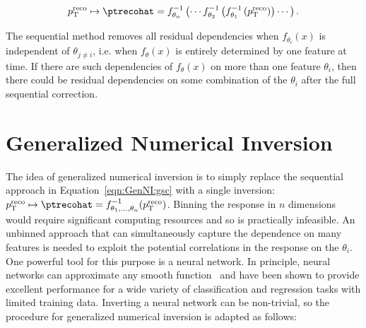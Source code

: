 \begin{align}
\label{eqn:GenNI:gsc}
p_\text{T}^\text{reco}\mapsto \ptrecohat = f_{\theta_{n}}^{-1}\left(\cdots f_{\theta_{2}}^{-1}\left(f_{\theta_{1}}^{-1}\left(p_\text{T}^\text{reco}\right)\right)\cdots\right).
\end{align}

The sequential method removes all residual dependencies when $f_{\theta_{i}}(x)$ is independent of $\theta_{j\neq i}$, i.e. when $f_{\theta}(x)$ is entirely determined by one feature at time.
If there are such dependencies of $f_{\theta}(x)$ on more than one feature $\theta_i$, then there could be residual dependencies on some combination of the $\theta_i$ after the full sequential correction.

\section{Generalized Numerical Inversion}
\label{sec:GenNI:genni}

The idea of generalized numerical inversion is to simply replace the sequential approach in Equation~\ref{eqn:GenNI:gsc} with a single inversion: $p_\text{T}^\text{reco}\mapsto \ptrecohat = f_{\theta_1,...,\theta_n}^{-1}(p_\text{T}^\text{reco})$.  Binning the response in $n$ dimensions would require significant computing resources and so is practically infeasible.  An unbinned approach that can simultaneously capture the dependence on many features is needed to exploit the potential correlations in the response on the $\theta_i$.  One powerful tool for this purpose is a neural network.  In principle, neural networks can approximate any smooth function~\cite{Cybenko1989,HORNIK1991251} and have been shown to provide excellent performance for a wide variety of classification and regression tasks with limited training data.  Inverting a neural network can be non-trivial, so the procedure for generalized numerical inversion is adapted as follows:

